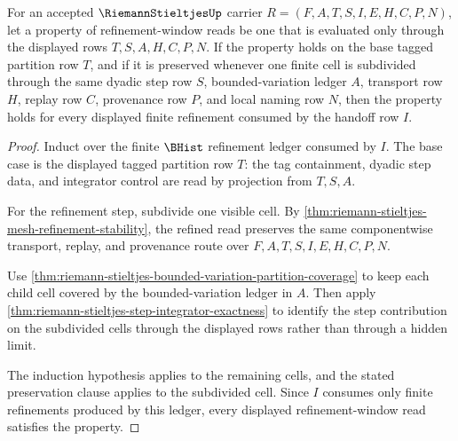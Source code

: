 \begin{theorem}
\label{thm:riemann-stieltjes-tagged-partition-induction}
For an accepted $\RiemannStieltjesUp$ carrier $R=(F,A,T,S,I,E,H,C,P,N)$, let a property of refinement-window reads be one that is evaluated only through the displayed rows $T,S,A,H,C,P,N$. If the property holds on the base tagged partition row $T$, and if it is preserved whenever one finite cell is subdivided through the same dyadic step row $S$, bounded-variation ledger $A$, transport row $H$, replay row $C$, provenance row $P$, and local naming row $N$, then the property holds for every displayed finite refinement consumed by the handoff row $I$.
\end{theorem}
\begin{proof}
Induct over the finite $\BHist$ refinement ledger consumed by $I$. The base case is the displayed tagged partition row $T$: the tag containment, dyadic step data, and integrator control are read by projection from $T,S,A$.

For the refinement step, subdivide one visible cell. By \autoref{thm:riemann-stieltjes-mesh-refinement-stability}, the refined read preserves the same componentwise transport, replay, and provenance route over $F,A,T,S,I,E,H,C,P,N$.

Use \autoref{thm:riemann-stieltjes-bounded-variation-partition-coverage} to keep each child cell covered by the bounded-variation ledger in $A$. Then apply \autoref{thm:riemann-stieltjes-step-integrator-exactness} to identify the step contribution on the subdivided cells through the displayed rows rather than through a hidden limit.

The induction hypothesis applies to the remaining cells, and the stated preservation clause applies to the subdivided cell. Since $I$ consumes only finite refinements produced by this ledger, every displayed refinement-window read satisfies the property.
\end{proof}

